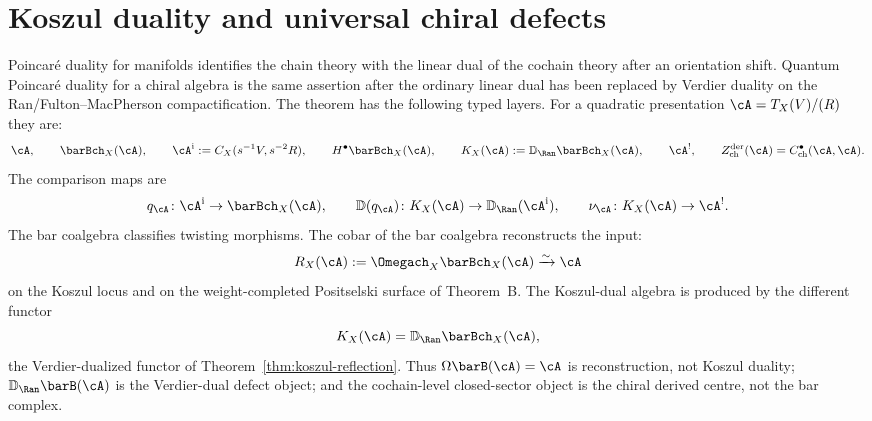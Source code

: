 
\section{Koszul duality and universal chiral defects}\label{sec:koszul-defects}

Poincar\'e duality for manifolds identifies the chain theory with the
linear dual of the cochain theory after an orientation shift.  Quantum
Poincar\'e duality for a chiral algebra is the same assertion after
the ordinary linear dual has been replaced by Verdier duality on the
Ran/Fulton--MacPherson compactification.  The theorem has the following
typed layers.  For a quadratic presentation
$\cA=T_X(V)/(R)$ they are:
\[
\cA,\qquad
\barBch_X(\cA),\qquad
\cA^{\mathrm i}:=C_X(s^{-1}V,s^{-2}R),\qquad
H^\bullet\barBch_X(\cA),\qquad
K_X(\cA):=\mathbb D_{\Ran}\barBch_X(\cA),\qquad
\cA^!,\qquad
Z^{\mathrm{der}}_{\mathrm{ch}}(\cA)
 = C^\bullet_{\mathrm{ch}}(\cA,\cA).
\]
The comparison maps are
\[
q_\cA\colon\cA^{\mathrm i}\to\barBch_X(\cA),\qquad
\mathbb D(q_\cA)\colon K_X(\cA)\to\mathbb D_{\Ran}(\cA^{\mathrm i}),
\qquad
\nu_\cA\colon K_X(\cA)\to\cA^!.
\]
The bar coalgebra classifies twisting morphisms.  The cobar of the
bar coalgebra reconstructs the input:
\[
R_X(\cA):=\Omegach_X\barBch_X(\cA)
\xrightarrow{\sim}\cA
\]
on the Koszul locus and on the weight-completed Positselski surface of
Theorem~B.  The Koszul-dual algebra is produced by the different
functor
\[
K_X(\cA)=\mathbb{D}_{\Ran}\barBch_X(\cA),
\]
the Verdier-dualized functor of
Theorem~\ref{thm:koszul-reflection}.  Thus
$\Omega\barB(\cA)=\cA$ is reconstruction, not Koszul duality;
$\mathbb{D}_{\Ran}\barB(\cA)$ is the Verdier-dual defect object; and
the cochain-level closed-sector object is the chiral derived centre, not the
bar complex.

